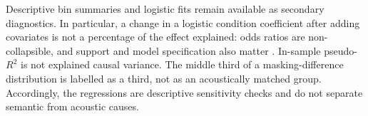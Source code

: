 
Descriptive bin summaries and logistic fits remain available as secondary
diagnostics. In particular, a change in a logistic condition coefficient after
adding covariates is not a percentage of the effect explained: odds ratios are
non-collapsible, and support and model specification also matter
\cite{noncollapsibility}. In-sample pseudo-$R^2$ is not explained causal
variance. The middle third of a masking-difference distribution is labelled as
a third, not as an acoustically matched group. Accordingly, the regressions
are descriptive sensitivity checks and do not separate semantic from acoustic causes.
